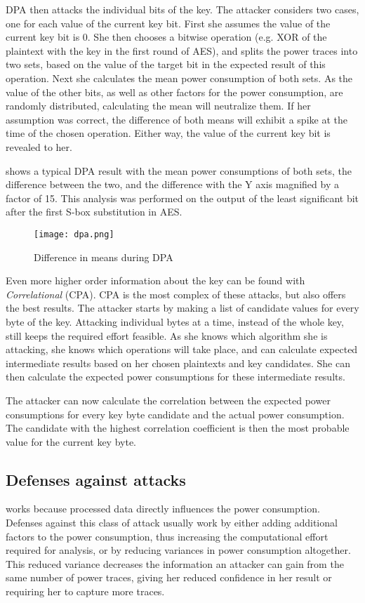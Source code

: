 DPA then attacks the individual bits of the key.
The attacker considers two cases, one for each value of the current key bit.
First she assumes the value of the current key bit is 0.
She then chooses a bitwise operation (e.g. XOR of the plaintext with the key in the first round of AES), and splits the power traces into two sets, based on the value of the target bit in the expected result of this operation.
Next she calculates the mean power consumption of both sets.
As the value of the other bits, as well as other factors for the power consumption, are randomly distributed, calculating the mean will neutralize them.
If her assumption was correct, the difference of both means will exhibit a spike at the time of the chosen operation.
Either way, the value of the current key bit is revealed to her.

 shows a typical DPA result with the mean power consumptions of both sets, the difference between the two, and the difference with the Y axis magnified by a factor of 15.
This analysis was performed on the output of the least significant bit after the first S-box substitution in AES.

\begin{figure}[h]
  \centering
  \texttt{[image: dpa.png]}
  \caption{Difference in means during DPA\cite{kocher2011introduction}}
  \label{fig:dpa}
\end{figure}

Even more higher order information about the key can be found with \emph{Correlational \poweranalysis{}} (CPA).
CPA is the most complex of these attacks, but also offers the best results.
The attacker starts by making a list of candidate values for every byte of the key.
Attacking individual bytes at a time, instead of the whole key, still keeps the required effort feasible.
As she knows which algorithm she is attacking, she knows which operations will take place, and can calculate expected intermediate results based on her chosen plaintexts and key candidates.
She can then calculate the expected power consumptions for these intermediate results.

The attacker can now calculate the correlation between the expected power consumptions for every key byte candidate and the actual power consumption.
The candidate with the highest correlation coefficient is then the most probable value for the current key byte.

\subsection{Defenses against \poweranalysis{} attacks}
\poweranalysis{} works because processed data directly influences the power consumption.
Defenses against this class of attack usually work by either adding additional factors to the power consumption, thus increasing the computational effort required for analysis, or by reducing variances in power consumption altogether.
This reduced variance decreases the information an attacker can gain from the same number of power traces, giving her reduced confidence in her result or requiring her to capture more traces.

